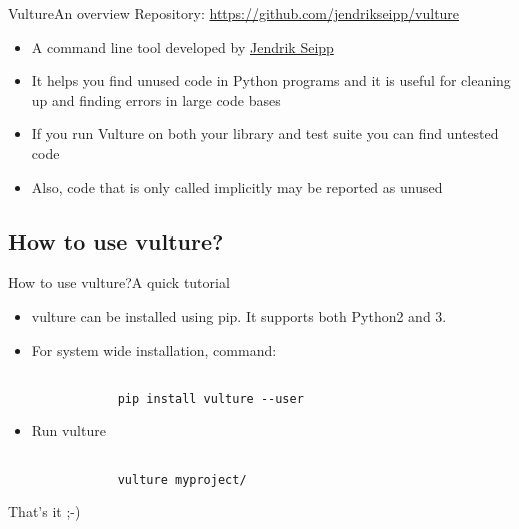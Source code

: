 \documentclass{beamer}
\begin{document}
\begin{frame}{Vulture}{An overview}
Repository: \url{https://github.com/jendrikseipp/vulture}

\begin{itemize}
    \item
    A command line tool developed by \href{https://github.com/jendrikseipp}{Jendrik Seipp}
    \pause
    \item
    It helps you find unused code in Python programs and it is useful for 
    cleaning up and finding errors in large code bases
    \pause
    \item
    If you run Vulture on both your library and test suite you can find untested code
    \pause
    \item
    Also, code that is only called implicitly may be reported as unused
\end{itemize}
\end{frame}

\subsection{How to use vulture?}

\begin{frame}{How to use vulture?}{A quick tutorial}

\begin{itemize}
    \item{
        vulture can be installed using pip. It supports both Python2 and 3.
    }
    \pause
    \item{
        For system wide installation, command:
        \begin{verbatim}

            pip install vulture --user

        \end{verbatim}
        \pause
    }
    \item{
        Run vulture
        \begin{verbatim}

            vulture myproject/

        \end{verbatim}
        \pause
    }
\end{itemize}

That's it ;-)
\end{frame}

\end{document}
